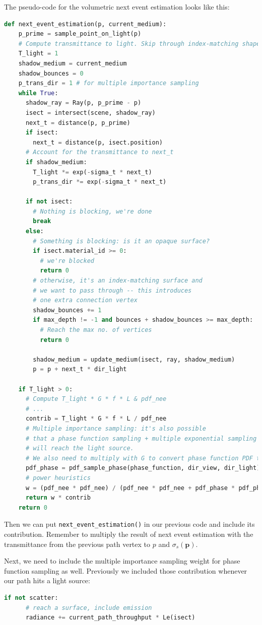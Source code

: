 The pseudo-code for the volumetric next event estimation looks like this:
\begin{lstlisting}[language=python]
def next_event_estimation(p, current_medium):
    p_prime = sample_point_on_light(p)
    # Compute transmittance to light. Skip through index-matching shapes.
    T_light = 1
    shadow_medium = current_medium
    shadow_bounces = 0
    p_trans_dir = 1 # for multiple importance sampling
    while True:
      shadow_ray = Ray(p, p_prime - p)
      isect = intersect(scene, shadow_ray)
      next_t = distance(p, p_prime)
      if isect:
        next_t = distance(p, isect.position)
      # Account for the transmittance to next_t
      if shadow_medium:
        T_light *= exp(-sigma_t * next_t)
        p_trans_dir *= exp(-sigma_t * next_t)

      if not isect:
        # Nothing is blocking, we're done
        break
      else:
        # Something is blocking: is it an opaque surface?
        if isect.material_id >= 0:
          # we're blocked
          return 0
        # otherwise, it's an index-matching surface and
        # we want to pass through -- this introduces
        # one extra connection vertex
        shadow_bounces += 1
        if max_depth != -1 and bounces + shadow_bounces >= max_depth:
          # Reach the max no. of vertices
          return 0

        shadow_medium = update_medium(isect, ray, shadow_medium)
        p = p + next_t * dir_light

    if T_light > 0:
      # Compute T_light * G * f * L & pdf_nee
      # ...
      contrib = T_light * G * f * L / pdf_nee
      # Multiple importance sampling: it's also possible
      # that a phase function sampling + multiple exponential sampling
      # will reach the light source.
      # We also need to multiply with G to convert phase function PDF to area measure.
      pdf_phase = pdf_sample_phase(phase_function, dir_view, dir_light) * G * p_trans_dir
      # power heuristics
      w = (pdf_nee * pdf_nee) / (pdf_nee * pdf_nee + pdf_phase * pdf_phase)
      return w * contrib
    return 0
\end{lstlisting}

Then we can put \lstinline{next_event_estimation()} in our previous code and include its contribution. Remember to multiply the result of next event estimation with the transmittance from the previous path vertex to $p$ and $\sigma_s(\mathbf{p})$.

Next, we need to include the multiple importance sampling weight for phase function sampling as well. Previously we included those contribution whenever our path hits a light source:
\begin{lstlisting}[language=python]
    if not scatter:
      # reach a surface, include emission
      radiance += current_path_throughput * Le(isect)
\end{lstlisting}

